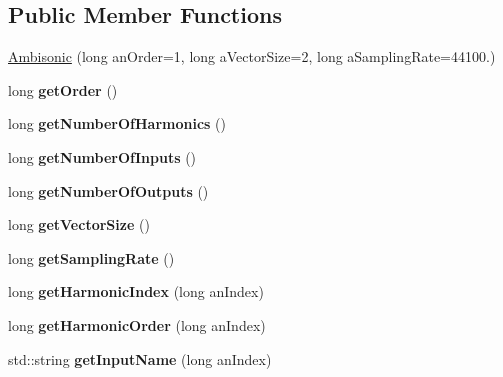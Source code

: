 \subsection*{Public Member Functions}
\begin{DoxyCompactItemize}
\item 
\hyperlink{class_ambisonic_ae704cc4472fd1efa22e39f7d501ca7e2}{Ambisonic} (long an\-Order=1, long a\-Vector\-Size=2, long a\-Sampling\-Rate=44100.)
\item 
\hypertarget{class_ambisonic_a677405a1c3aa359753bd675d4614e7da}{long {\bfseries get\-Order} ()}\label{class_ambisonic_a677405a1c3aa359753bd675d4614e7da}

\item 
\hypertarget{class_ambisonic_aa9d613f38e6876326201995a5a415410}{long {\bfseries get\-Number\-Of\-Harmonics} ()}\label{class_ambisonic_aa9d613f38e6876326201995a5a415410}

\item 
\hypertarget{class_ambisonic_af03625afb9f21ef3574eafa8501129b4}{long {\bfseries get\-Number\-Of\-Inputs} ()}\label{class_ambisonic_af03625afb9f21ef3574eafa8501129b4}

\item 
\hypertarget{class_ambisonic_a126ed3be1aa3d155f56ca75ca3d69de5}{long {\bfseries get\-Number\-Of\-Outputs} ()}\label{class_ambisonic_a126ed3be1aa3d155f56ca75ca3d69de5}

\item 
\hypertarget{class_ambisonic_aeff6773fb00c302cc58ab1c4b513cfe1}{long {\bfseries get\-Vector\-Size} ()}\label{class_ambisonic_aeff6773fb00c302cc58ab1c4b513cfe1}

\item 
\hypertarget{class_ambisonic_a26d8f829f516d8067c4b2da99512ea12}{long {\bfseries get\-Sampling\-Rate} ()}\label{class_ambisonic_a26d8f829f516d8067c4b2da99512ea12}

\item 
\hypertarget{class_ambisonic_a5ed4424a003cc2982ccb9a3a8008560e}{long {\bfseries get\-Harmonic\-Index} (long an\-Index)}\label{class_ambisonic_a5ed4424a003cc2982ccb9a3a8008560e}

\item 
\hypertarget{class_ambisonic_a76ca75ba74acfdcfe705d0a803d870fc}{long {\bfseries get\-Harmonic\-Order} (long an\-Index)}\label{class_ambisonic_a76ca75ba74acfdcfe705d0a803d870fc}

\item 
\hypertarget{class_ambisonic_ac799f870b063cef36fdf831ddc9d58aa}{std\-::string {\bfseries get\-Input\-Name} (long an\-Index)}\label{class_ambisonic_ac799f870b063cef36fdf831ddc9d58aa}


\end{DoxyCompactItemize}
